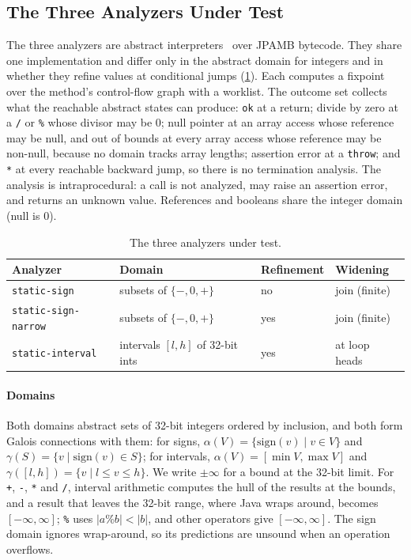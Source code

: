 \subsection{The Three Analyzers Under Test}
\label{sec:analyzers}
The three analyzers are abstract interpreters~\citep{cousot1977} over JPAMB
bytecode. They share one implementation and differ only in the abstract domain
for integers and in whether they refine values at conditional jumps
(\cref{tab:analyzers}). Each computes a fixpoint over the method's
control-flow graph with a worklist. The outcome set collects what the reachable
abstract states can produce: \texttt{ok} at a return; divide by zero at a
\texttt{/} or \texttt{\%} whose divisor may be 0; null pointer at an array
access whose reference may be null, and out of bounds at every array access
whose reference may be non-null, because no domain tracks array lengths;
assertion error at a \texttt{throw}; and \texttt{*} at every reachable
backward jump, so there is no termination analysis. The analysis is
intraprocedural: a call is not analyzed, may raise an assertion error, and
returns an unknown value. References and booleans share the integer domain
(null is 0).

\begin{table}[t]
\caption{The three analyzers under test.}
\label{tab:analyzers}
\small
\begin{tabular}{@{}llll@{}}
\toprule
Analyzer & Domain & Refinement & Widening \\
\midrule
\texttt{static-sign} & subsets of $\{-,0,+\}$ & no & join (finite) \\
\texttt{static-sign-narrow} & subsets of $\{-,0,+\}$ & yes & join (finite) \\
\texttt{static-interval} & intervals $[l,h]$ of 32-bit ints & yes & at loop heads \\
\bottomrule
\end{tabular}
\end{table}

\paragraph{Domains}
Both domains abstract sets of 32-bit integers ordered by inclusion, and both
form Galois connections with them: for signs,
$\alpha(V)=\{\mathrm{sign}(v) \mid v\in V\}$ and
$\gamma(S)=\{v \mid \mathrm{sign}(v)\in S\}$; for intervals,
$\alpha(V)=[\min V,\max V]$ and $\gamma([l,h])=\{v \mid l\le v\le h\}$. We
write $\pm\infty$ for a bound at the 32-bit limit. For \texttt{+}, \texttt{-},
\texttt{*} and \texttt{/}, interval arithmetic computes the hull of the
results at the bounds, and a result that leaves the 32-bit range, where Java
wraps around, becomes $[-\infty,\infty]$; \texttt{\%} uses $|a \% b| < |b|$,
and other operators give $[-\infty,\infty]$. The sign domain ignores
wrap-around, so its predictions are unsound when an operation overflows.

